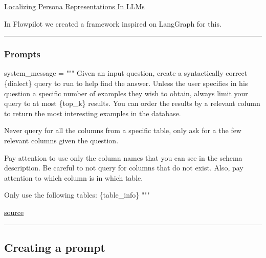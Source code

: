 \documentclass[
  letterpaper,
  DIV=11,
  numbers=noendperiod]{scrartcl}
\newenvironment{Shaded}{\begin{snugshade}}{\end{snugshade}}
\newcommand{\NormalTok}[1]{\textcolor[rgb]{0.00,0.23,0.31}{#1}}
\newcommand{\OperatorTok}[1]{\textcolor[rgb]{0.37,0.37,0.37}{#1}}
\newcommand{\SpecialCharTok}[1]{\textcolor[rgb]{0.37,0.37,0.37}{#1}}
\newcommand{\StringTok}[1]{\textcolor[rgb]{0.13,0.47,0.30}{#1}}
\begin{document}
\href{https://arxiv.org/pdf/2505.24539}{ Localizing Persona
Representations In LLMs}

In Flowpilot we created a framework inspired on LangGraph for this.

\begin{center}\rule{0.5\linewidth}{0.5pt}\end{center}

\subsubsection{Prompts}\label{prompts}

\begin{Shaded}
\begin{Highlighting}[numbers=left,,]
\NormalTok{system\_message }\OperatorTok{=} \StringTok{"""}
\StringTok{Given an input question, create a syntactically correct }\SpecialCharTok{\{dialect\}}\StringTok{ query to}
\StringTok{run to help find the answer. Unless the user specifies in his question a}
\StringTok{specific number of examples they wish to obtain, always limit your query to}
\StringTok{at most }\SpecialCharTok{\{top\_k\}}\StringTok{ results. You can order the results by a relevant column to}
\StringTok{return the most interesting examples in the database.}

\StringTok{Never query for all the columns from a specific table, only ask for a the}
\StringTok{few relevant columns given the question.}

\StringTok{Pay attention to use only the column names that you can see in the schema}
\StringTok{description. Be careful to not query for columns that do not exist. Also,}
\StringTok{pay attention to which column is in which table.}

\StringTok{Only use the following tables:}
\SpecialCharTok{\{table\_info\}}
\StringTok{"""}
\end{Highlighting}
\end{Shaded}

\href{https://python.langchain.com/docs/tutorials/sql_qa/\#convert-question-to-sql-query}{source
}

\begin{center}\rule{0.5\linewidth}{0.5pt}\end{center}

\subsection{Creating a prompt}\label{creating-a-prompt}
\end{document}
